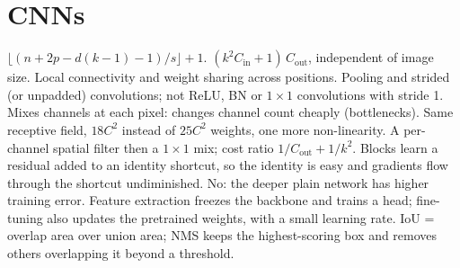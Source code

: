 \section{CNNs}
\begin{rapid}
	 $\lfloor(n+2p-d(k-1)-1)/s\rfloor+1$.
	 $(k^2C_\text{in}+1)\,C_\text{out}$, independent of image size.
	 Local connectivity and weight sharing across positions.
	 Pooling and strided (or unpadded) convolutions; not ReLU, BN or $1\times1$ convolutions
	with stride 1.
	 Mixes channels at each pixel: changes channel count cheaply (bottlenecks).
	 Same receptive field, $18C^2$ instead of $25C^2$ weights, one
	more non-linearity.
	 A per-channel spatial filter then a $1\times1$ mix; cost ratio
	$1/C_\text{out}+1/k^2$.
	 Blocks learn a residual added to an identity shortcut, so the identity is easy and
	gradients flow through the shortcut undiminished.
	 No: the deeper plain network has higher training error.
	 Feature extraction freezes the backbone and trains a head; fine-tuning also updates the
	pretrained weights, with a small learning rate.
	 IoU = overlap area over union area; NMS keeps the highest-scoring box and removes others overlapping
	it beyond a threshold.
\end{rapid}

